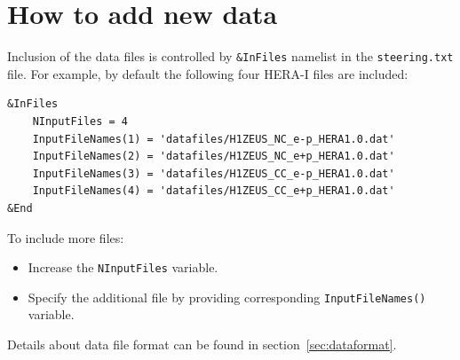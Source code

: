 \documentclass[11pt,twoside,a4paper]{article}
\begin{document}
\section{How to add new data}
Inclusion of the data files is controlled by {\tt \&InFiles} namelist in the 
{\tt steering.txt} file. For example, by default the following four HERA-I
    files are included:
\begin{verbatim}
&InFiles
    NInputFiles = 4
    InputFileNames(1) = 'datafiles/H1ZEUS_NC_e-p_HERA1.0.dat'
    InputFileNames(2) = 'datafiles/H1ZEUS_NC_e+p_HERA1.0.dat'
    InputFileNames(3) = 'datafiles/H1ZEUS_CC_e-p_HERA1.0.dat'
    InputFileNames(4) = 'datafiles/H1ZEUS_CC_e+p_HERA1.0.dat'
&End
\end{verbatim}

To include more files:
\begin{itemize}
 \item  Increase the {\tt NInputFiles} variable.
 \item  Specify the additional file by providing corresponding
  {\tt InputFileNames()} variable.
\end{itemize}
Details about data file format can be found in section~\ref{sec:dataformat}.


\end{document}
